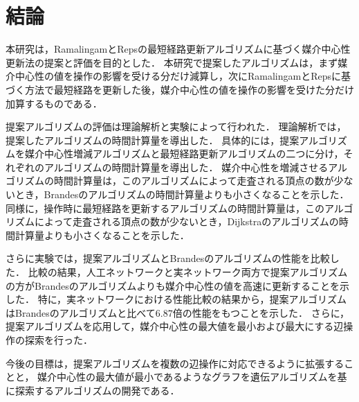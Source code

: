 \chapter{結論}
\label{chap:conclusion}
本研究は，RamalingamとRepsの最短経路更新アルゴリズムに基づく媒介中心性更新法の提案と評価を目的とした．
本研究で提案したアルゴリズムは，まず媒介中心性の値を操作の影響を受ける分だけ減算し，次にRamalingamとRepsに基づく方法で最短経路を更新した後，媒介中心性の値を操作の影響を受けた分だけ加算するものである．

提案アルゴリズムの評価は理論解析と実験によって行われた．
理論解析では，提案したアルゴリズムの時間計算量を導出した．
具体的には，提案アルゴリズムを媒介中心性増減アルゴリズムと最短経路更新アルゴリズムの二つに分け，それぞれのアルゴリズムの時間計算量を導出した．
媒介中心性を増減させるアルゴリズムの時間計算量は，このアルゴリズムによって走査される頂点の数が少ないとき，Brandesのアルゴリズムの時間計算量よりも小さくなることを示した．
同様に，操作時に最短経路を更新するアルゴリズムの時間計算量は，このアルゴリズムによって走査される頂点の数が少ないとき，Dijkstraのアルゴリズムの時間計算量よりも小さくなることを示した．

さらに実験では，提案アルゴリズムとBrandesのアルゴリズムの性能を比較した．
比較の結果，人工ネットワークと実ネットワーク両方で提案アルゴリズムの方がBrandesのアルゴリズムよりも媒介中心性の値を高速に更新することを示した．
特に，実ネットワークにおける性能比較の結果から，提案アルゴリズムはBrandesのアルゴリズムと比べて$6.87$倍の性能をもつことを示した．
さらに，提案アルゴリズムを応用して，媒介中心性の最大値を最小および最大にする辺操作の探索を行った．

今後の目標は，提案アルゴリズムを複数の辺操作に対応できるように拡張することと，
媒介中心性の最大値が最小であるようなグラフを遺伝アルゴリズムを基に探索するアルゴリズムの開発である．
